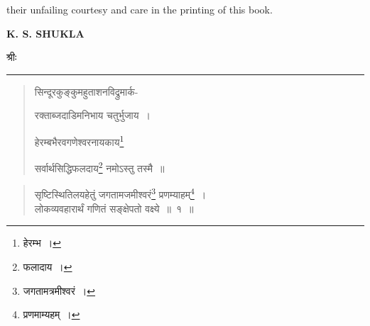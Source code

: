 \documentclass[10pt, openany]{book}
\begin{document}
\vspace{0.3cm}{My thanks are also due to the Fine Press, Lucknow, for}
{their unfailing courtesy and care in the printing of this book.}
\vspace{3mm}

\hfill {\textbf{K. S. SHUKLA}}~~~~~

\newpage
\thispagestyle{empty}

\sanskritfont

\noindent\begin{center}{श्रीः}


\vspace{0.3cm}{श्रीधराचार्यविरचितं टीकासनाथीकृतम् }

\vspace{0.2cm}\rule{0.2\linewidth}{0.7pt}\end{center}
\vspace{2mm}

\begin{quote}
\qt \hspace{4mm} सिन्दूरकुङ्कुमहुताशनविद्रुमार्क- 
\vspace{-1mm}

 \hspace{1cm}रक्ताब्जदाडिमनिभाय चतुर्भुजाय~। 
\vspace{-1mm}

\hspace{4mm}  हेरम्बभैरवगणेश्वरनायकाय\renewcommand{\thefootnote}{\s १}\footnote{\s हेरम्भ~।}
\vspace{-1mm}

\hspace{1cm} सर्वार्थसिद्धिफलदाय\renewcommand{\thefootnote}{\s २}\footnote{\s फलादाय~।} नमोऽस्तु तस्मै~॥
\end{quote}

 \label{Mang}
\begin{quote}  
{\bs सृष्टिस्थितिलयहेतुं जगतामजमीश्वरं\renewcommand{\thefootnote}{\s ३}\footnote{\s जगतामत्रमीश्वरं~।} प्रणम्याहम्\renewcommand{\thefootnote}{\s ४}\footnote{\s प्रणमाम्यहम्~।}~।\\
 लोकव्यवहारार्थं गणितं सङ्क्षेपतो वक्ष्ये~॥~१~॥} 
\end{quote}
\end{document}
